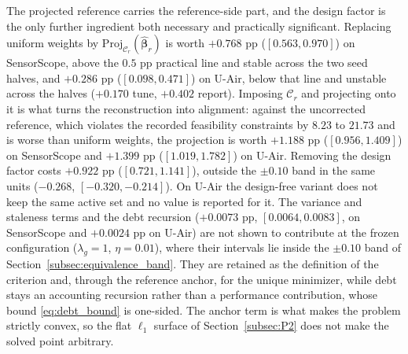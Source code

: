 \documentclass[letterpaper,journal]{IEEEtran}
\begin{document}
The projected reference carries the reference-side part, and the design factor is
the only further ingredient both necessary and practically significant.
Replacing uniform weights by
$\mathrm{Proj}_{\mathcal{C}_r}(\widehat{\boldsymbol\beta}_r)$ is worth $+0.768$ pp
($[0.563,0.970]$) on SensorScope, above the $0.5$ pp practical line and stable
across the two seed halves, and $+0.286$ pp ($[0.098,0.471]$) on U-Air, below
that line and unstable across the halves ($+0.170$ tune, $+0.402$ report).
Imposing $\mathcal{C}_r$ and projecting onto it is what turns the reconstruction
into alignment: against the uncorrected reference, which violates the recorded
feasibility constraints by $8.23$ to $21.73$ and is worse than uniform weights,
the projection is worth $+1.188$ pp ($[0.956,1.409]$) on SensorScope and
$+1.399$ pp ($[1.019,1.782]$) on U-Air.  Removing the design factor costs
$+0.922$ pp ($[0.721,1.141]$), outside the $\pm0.10$ band in the same units
($-0.268$, $[-0.320,-0.214]$).  On U-Air the design-free variant does not keep
the same active set and no value is reported for it.  The variance and staleness
terms and the debt recursion
($+0.0073$ pp, $[0.0064,0.0083]$, on SensorScope and $+0.0024$ pp on U-Air)
are not shown to contribute at the frozen configuration
($\lambda_g=1$, $\eta=0.01$), where their intervals lie inside the $\pm0.10$
band of Section~\ref{subsec:equivalence_band}.  They are retained as the
definition of the criterion and, through the reference anchor, for the unique
minimizer, while debt stays an accounting recursion rather than a performance
contribution, whose bound \eqref{eq:debt_bound} is one-sided.  The anchor term is
what makes the problem strictly convex, so the flat $\ell_1$ surface of
Section~\ref{subsec:P2} does not make the solved point arbitrary.
\end{document}
